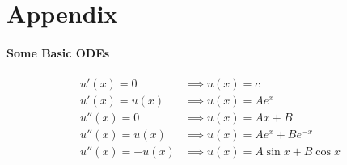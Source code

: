 \documentclass{article}
\begin{document}
	\section{Appendix}
	\paragraph{Some Basic ODEs}
	\begin{align}
		u'(x) = 0 &\implies u(x) = c \\
		u'(x) = u(x) &\implies u(x) = A e^x \\
		u''(x) = 0 &\implies u(x) = Ax + B \\
		u''(x) = u(x) &\implies u(x) = A e^x + B e^{-x} \\
		u''(x) = -u(x) &\implies u(x) = A \sin x + B \cos x
	\end{align}
\end{document}
